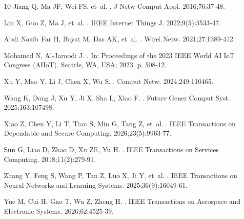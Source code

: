 \begin{thebibliography}{10}
Jiang Q, Ma JF, Wei FS, et~al.
.
\newblock J Netw Comput Appl. 2016;76:37-48.

Liu X, Guo Z, Ma J, et~al.
.
\newblock IEEE Internet Things J. 2022;9(5):3533-47.

Abdi Nasib~Far H, Bayat M, Das AK, et~al.
.
\newblock Wirel Netw. 2021;27:1389-412.

Mohamed N, Al-Jaroodi J.
.
\newblock In: Proceedings of the 2023 IEEE World AI IoT Congress (AIIoT).
  Seattle, WA, USA; 2023. p. 508-12.

Xu Y, Mao Y, Li J, Chen X, Wu S.
.
\newblock Comput Netw. 2024;249:110465.

Wang K, Dong J, Xu Y, Ji X, Sha L, Xiao F.
.
\newblock Future Gener Comput Syst. 2025;163:107498.

Xiao Z, Chen Y, Li T, Tian S, Min G, Tang Z, et~al.
.
\newblock IEEE Transactions on Dependable and Secure Computing.
  2026;23(5):9963-77.

Sun G, Liao D, Zhao D, Xu ZE, Yu H.
.
\newblock IEEE Transactions on Services Computing. 2018;11(2):279-91.

Zhang Y, Feng S, Wang P, Tan Z, Luo X, Ji Y, et~al.
.
\newblock IEEE Transactions on Neural Networks and Learning Systems.
  2025;36(9):16049-61.

Yue M, Cui H, Gao T, Wu Z, Zheng H.
.
\newblock IEEE Transactions on Aerospace and Electronic Systems.
  2026;62:4525-39.


\end{thebibliography}
